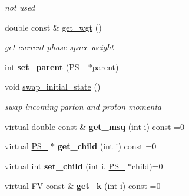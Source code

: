 \begin{DoxyCompactItemize}
\begin{DoxyCompactList}\small\item\em not used \end{DoxyCompactList}\item 
\hypertarget{classPS__2_a049e0480c37ac84a8319f19bcfb335ab}{}double const \& \hyperlink{classPS__2_a049e0480c37ac84a8319f19bcfb335ab}{get\+\_\+wgt} ()\label{classPS__2_a049e0480c37ac84a8319f19bcfb335ab}

\begin{DoxyCompactList}\small\item\em get current phase space weight \end{DoxyCompactList}\item 
\hypertarget{classPS__2_a743942dc8d537cfed9d229aad62aa96a}{}int {\bfseries set\+\_\+parent} (\hyperlink{classPS__2}{P\+S\+\_} $\ast$parent)\label{classPS__2_a743942dc8d537cfed9d229aad62aa96a}

\item 
\hypertarget{classPS__2_afefab6481fa7a0dde6ddc5a1f8d1642f}{}void \hyperlink{classPS__2_afefab6481fa7a0dde6ddc5a1f8d1642f}{swap\+\_\+initial\+\_\+state} ()\label{classPS__2_afefab6481fa7a0dde6ddc5a1f8d1642f}

\begin{DoxyCompactList}\small\item\em swap incoming parton and proton momenta \end{DoxyCompactList}\item 
\hypertarget{classPS__2_a5865322be9736bf043cc8bd1d5127a52}{}virtual double const \& {\bfseries get\+\_\+msq} (int i) const =0\label{classPS__2_a5865322be9736bf043cc8bd1d5127a52}

\item 
\hypertarget{classPS__2_af44e67d84bc53b126d720907adeaffc2}{}virtual \hyperlink{classPS__2}{P\+S\+\_} $\ast$ {\bfseries get\+\_\+child} (int i) const =0\label{classPS__2_af44e67d84bc53b126d720907adeaffc2}

\item 
\hypertarget{classPS__2_a74d62c9ae71d30741838408fabaf4ba3}{}virtual int {\bfseries set\+\_\+child} (int i, \hyperlink{classPS__2}{P\+S\+\_} $\ast$child)=0\label{classPS__2_a74d62c9ae71d30741838408fabaf4ba3}

\item 
\hypertarget{classPS__2_aa23e50a0b5d3ac32fb63afb4f67d3910}{}virtual \hyperlink{classFV}{F\+V} const \& {\bfseries get\+\_\+k} (int i) const =0\label{classPS__2_aa23e50a0b5d3ac32fb63afb4f67d3910}


\end{DoxyCompactItemize}
